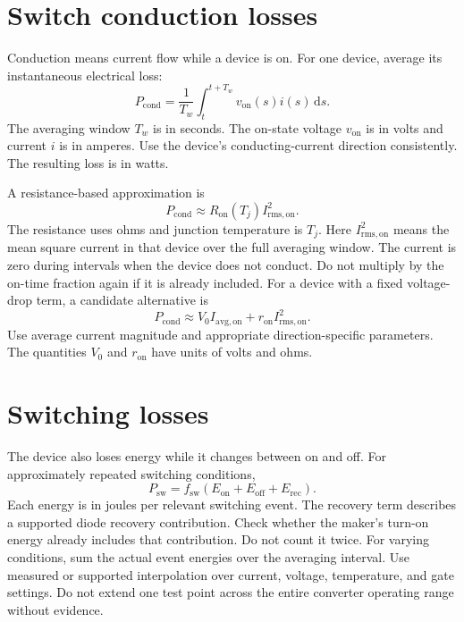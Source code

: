 \documentclass[11pt,a4paper]{report}
\newcommand{\dd}{\mathrm{d}}
\begin{document}
\section{Switch conduction losses}
Conduction means current flow while a device is on.
For one device, average its instantaneous electrical loss:
\begin{equation}
P_{\mathrm{cond}}=\frac{1}{T_w}\int_{t}^{t+T_w}v_{\mathrm{on}}(s)i(s)\,\dd s.
\end{equation}
The averaging window $T_w$ is in seconds.
The on-state voltage $v_{\mathrm{on}}$ is in volts and current $i$ is in amperes.
Use the device's conducting-current direction consistently.
The resulting loss is in watts.

A resistance-based approximation is
\begin{equation}
P_{\mathrm{cond}}\approx R_{\mathrm{on}}(T_j)I_{\mathrm{rms,on}}^2.
\end{equation}
The resistance uses ohms and junction temperature is $T_j$.
Here $I_{\mathrm{rms,on}}^2$ means the mean square current in that device over the full averaging window.
The current is zero during intervals when the device does not conduct.
Do not multiply by the on-time fraction again if it is already included.
For a device with a fixed voltage-drop term, a candidate alternative is
\begin{equation}
P_{\mathrm{cond}}\approx V_0I_{\mathrm{avg,on}}+r_{\mathrm{on}}I_{\mathrm{rms,on}}^2.
\end{equation}
Use average current magnitude and appropriate direction-specific parameters.
The quantities $V_0$ and $r_{\mathrm{on}}$ have units of volts and ohms.

\section{Switching losses}
The device also loses energy while it changes between on and off.
For approximately repeated switching conditions,
\begin{equation}
P_{\mathrm{sw}}=f_{\mathrm{sw}}
(E_{\mathrm{on}}+E_{\mathrm{off}}+E_{\mathrm{rec}}).
\end{equation}
Each energy is in joules per relevant switching event.
The recovery term describes a supported diode recovery contribution.
Check whether the maker's turn-on energy already includes that contribution.
Do not count it twice.
For varying conditions, sum the actual event energies over the averaging interval.
Use measured or supported interpolation over current, voltage, temperature, and gate settings.
Do not extend one test point across the entire converter operating range without evidence.
\end{document}

